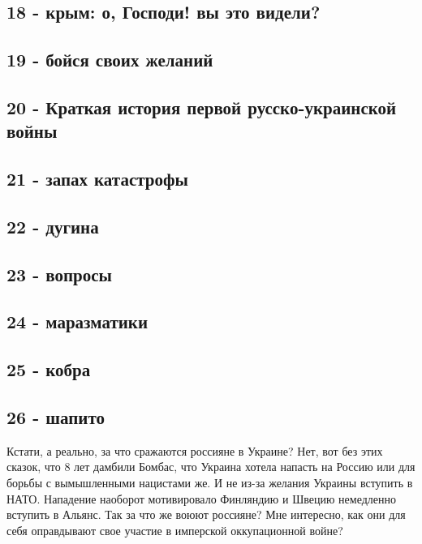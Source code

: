 \subsection{18 - крым: о, Господи! вы это видели?}

\subsection{19 - бойся своих желаний}

\subsection{20 - Краткая история первой русско-украинской войны}

\subsection{21 - запах катастрофы}

\subsection{22 - дугина}

\subsection{23 - вопросы}

\subsection{24 - маразматики}

\subsection{25 - кобра}

\subsection{26 - шапито}

Кстати, а реально, за что сражаются россияне в Украине? Нет, вот без этих
сказок, что 8 лет дамбили Бомбас, что Украина хотела напасть на Россию или для
борьбы с вымышленными нацистами же. И не из-за желания Украины вступить в НАТО.
Нападение наоборот мотивировало Финляндию и Швецию немедленно вступить в
Альянс. Так за что же воюют россияне? Мне интересно, как они для себя
оправдывают свое участие в имперской оккупационной войне?

